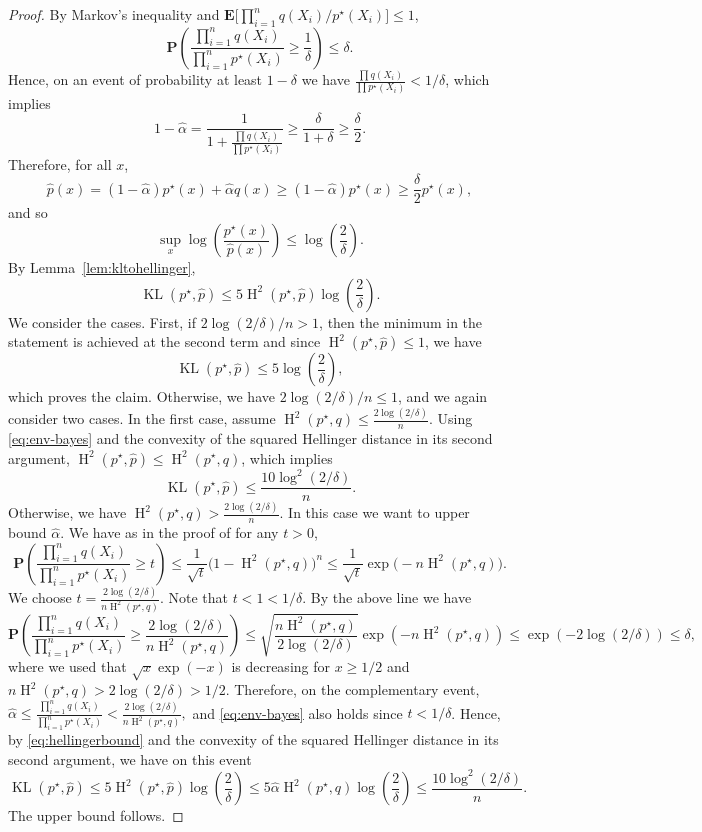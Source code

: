\documentclass[10pt,a4paper]{amsart}
\newcommand{\E}{{\mathbf E}}
\renewcommand{\P}{\mathbf P}
\renewcommand{\le}{\leqslant}
\renewcommand{\ge}{\geqslant}
\newcommand{\kl}{\operatorname{KL}}
\newcommand{\hel}{\operatorname{H}}
\newcommand{\hels}{\hel^2}
\begin{document}
\begin{proof}
By Markov's inequality and $\E\big[\prod_{i=1}^n q(X_i)/p^\star(X_i)\big]\le 1$,
\[
\P\left(\frac{\prod_{i=1}^n q(X_i)}{\prod_{i=1}^n p^\star(X_i)}\ge \frac{1}{\delta}\right)\le \delta.
\]
Hence, on an event of probability at least $1-\delta$ we have $\frac{\prod q(X_i)}{\prod p^\star(X_i)}<1/\delta$, which implies
\[
1-\widehat\alpha=\frac{1}{1+\frac{\prod q(X_i)}{\prod p^\star(X_i)}}\ge \frac{\delta}{1+\delta}\ge \frac{\delta}{2}.
\]
Therefore, for all $x$, 
\[
\widehat p(x)=(1-\widehat\alpha)p^\star(x)+\widehat\alpha q(x)\ge (1-\widehat\alpha)p^\star(x)\ge \frac{\delta}{2}p^\star(x),
\]
and so
\begin{equation}
\label{eq:env-bayes}
\sup_{x}\log\left(\frac{p^\star(x)}{\widehat p(x)}\right)\le \log\left(\frac{2}{\delta}\right).
\end{equation}
By Lemma~\ref{lem:kltohellinger},
\begin{equation}
\label{eq:hellingerbound}
\kl(p^\star,\widehat p)\le 5\hels(p^\star,\widehat p)\log\left(\frac{2}{\delta}\right).
\end{equation}
We consider the cases. First, if $2\log(2/\delta)/n > 1$, then the minimum in the statement is achieved at the second term and since $\hels(p^\star,\widehat p) \le 1$, we have
\[
\kl(p^\star,\widehat p)\le 5\log\left(\frac{2}{\delta}\right),
\]
which proves the claim. Otherwise, we have $2\log(2/\delta)/n \le 1$, and we again consider two cases. In the first case, assume $\hels(p^\star,q)\le \frac{2\log(2/\delta)}{n}$.
Using \eqref{eq:env-bayes} and the convexity of the squared Hellinger distance in its second argument, $\hels(p^\star,\widehat p)\le \hels(p^\star,q)$, which implies
\[
\kl(p^\star,\widehat p)\le \frac{10\log^2(2/\delta)}{n}.
\]
Otherwise, we have $\hels(p^\star,q) > \frac{2\log(2/\delta)}{n}$. In this case we want to upper bound $\widehat{\alpha}$. We have as in the proof of  for any $t > 0$,
\[
\P\left(
\frac{\prod_{i=1}^n q(X_i)}{\prod_{i=1}^n p^\star(X_i)} \ge t
\right)
\le
\frac{1}{\sqrt{t}}\bigl(1-\hels(p^\star,q)\bigr)^n
\le
\frac{1}{\sqrt{t}} \exp\bigl(-n\hels(p^\star,q)\bigr).
\]
We choose $t = \frac{2\log(2/\delta)}{n\hels(p^\star,q)}$. Note that $t<1<1/\delta$. By the above line we have
\[
\P\left(
\frac{\prod_{i=1}^n q(X_i)}{\prod_{i=1}^n p^\star(X_i)}
\ge
\frac{2\log(2/\delta)}{n\hels(p^\star,q)}
\right)
\le
\sqrt{\frac{n\hels(p^\star,q)}{2\log(2/\delta)}}\exp(-n\hels(p^\star,q))
\le
\exp(-2\log(2/\delta))
\le
\delta,
\]
where we used that $\sqrt{x}\exp(-x)$ is decreasing for $x \ge 1/2$ and $n\hels(p^\star,q) > 2\log(2/\delta) > 1/2$. Therefore, on the complementary event,
$
\widehat{\alpha}
\le
\frac{\prod_{i=1}^n q(X_i)}{\prod_{i=1}^n p^\star(X_i)}
<
\frac{2\log(2/\delta)}{n\hels(p^\star,q)},
$
and \eqref{eq:env-bayes} also holds since $t<1/\delta$. 
Hence, by \eqref{eq:hellingerbound} and the convexity of the squared Hellinger distance in its second argument, we have on this event
\[
\kl(p^\star,\widehat p)
\le
5\hels(p^\star,\widehat p)\log\left(\frac{2}{\delta}\right)
\le
5\widehat{\alpha}\hels(p^\star,q)\log\left(\frac{2}{\delta}\right)
\le
\frac{10\log^2(2/\delta)}{n}.
\]
The upper bound follows.


\end{proof}
\end{document}
